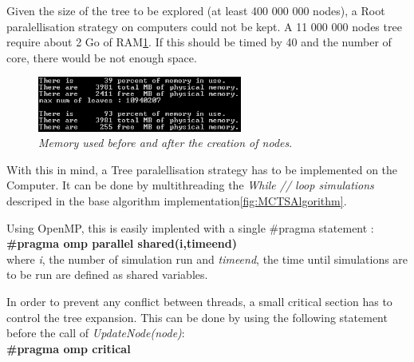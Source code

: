 Given the size of the tree to be explored (at least 400 000 000 nodes), a Root paralellisation strategy on computers could not be kept. A 11 000 000 nodes tree require about 2 Go of RAM\ref{fig:RAMTree}. If this should be timed by 40 and the number of core, there would be not enough space.
\begin{figure}[H]
\centerline{\includegraphics[width=0.6\textwidth]{Parallelisation/Computer/Img/RAM.png}}
\caption{\label{fig:RAMTree}\textit{Memory used before and after the creation of nodes}.}
\end{figure}

With this in mind, a Tree paralellisation strategy has to be implemented on the Computer. It can be done by multithreading the \textit{While // loop simulations} descriped in the base algorithm implementation\ref{fig:MCTSAlgorithm}.

Using OpenMP, this is easily implented with a single \#pragma statement :\\
\textbf{\#pragma omp parallel shared(i,timeend)}\\
where \textit{i}, the number of simulation run and \textit{timeend}, the time until simulations are to be run are defined as shared variables.

In order to prevent any conflict between threads, a small critical section has to control the tree expansion. This can be done by using the following statement before the call of \textit{UpdateNode(node)}:\\
\textbf{\#pragma omp critical}